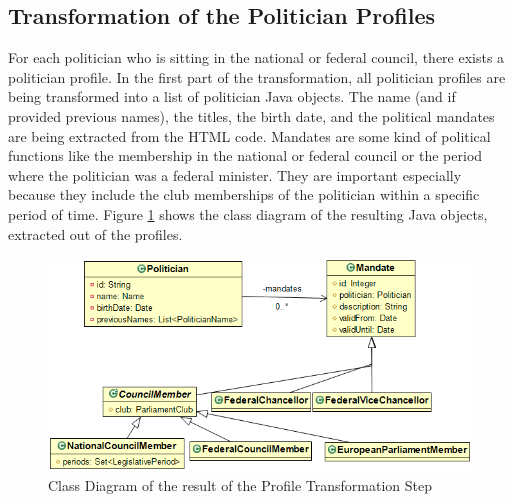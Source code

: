 \subsection{Transformation of the Politician Profiles}
For each politician who is sitting in the national or federal council, there exists a politician profile. In the first part of the transformation, all politician profiles are being transformed into a list of politician Java objects. The name (and if provided previous names), the titles, the birth date, and the political mandates are being extracted from the HTML code. Mandates are some kind of political functions like the membership in the national or federal council or the period where the politician was a federal minister. They are important especially because they include the club memberships of the politician within a specific period of time. 
Figure \ref{fig:politicians_mandates_class_diagram} shows the class diagram of the resulting Java objects, extracted out of the profiles.


\begin{figure}
	\centering
	\includegraphics[width=\textwidth]{imgs/politicians_mandates_class_diagram}
	\caption{Class Diagram of the result of the Profile Transformation Step}
	\label{fig:politicians_mandates_class_diagram}
\end{figure}

